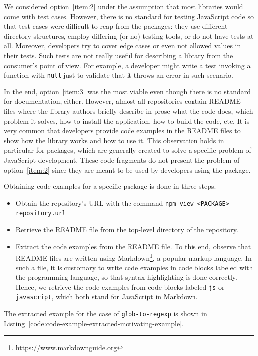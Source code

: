 \documentclass[english,cleveref,autoref,submission]{programming}
\newcommand{\coderef}[1]{Listing~\ref{#1}}
\begin{document}
We considered option~\ref{item:2} under the assumption that most
libraries would come with test cases. However, there is no standard
for testing JavaScript code so that test cases were difficult to reap
from the \NPM{} packages: they use different directory structures,
employ differing (or no) testing tools, or do not have tests
at all. Moreover, developers try to cover edge cases or even not allowed values in their tests. Such tests are not really useful for describing a library from the consumer's point of view. For example, a developer might write a test invoking a function with \texttt{null} just to validate that it throws an error in such scenario.

In the end, option~\ref{item:3} was the most viable even though there
is no standard for documentation, either. However, almost all repositories
contain README files where the library authors briefly describe in prose what
the code does, which problem it solves, how to install the
application, how to build the code, etc. It is very common that
developers provide code examples in the README files to show how the
library works and how to use it. This observation holds in particular
for \NPM{} packages, which are generally created to solve a specific
problem of JavaScript development. These code fragments do not present the problem of option~\ref{item:2} since they are meant to be used by developers using the package.


Obtaining code examples for a specific \NPM{} package is done in three steps.
\begin{itemize}
\item Obtain the  repository's URL with the command
  \texttt{npm view <PACKAGE> repository.url}

\item Retrieve the README file from the top-level directory of the repository.

\item Extract the code examples from the README file. To this end,
  observe that README files are
  written using Markdown\footnote{\url{https://www.markdownguide.org}}, a
  popular markup language. In such a file, it is customary to write
  code examples in code blocks labeled with the programming
  language, so that syntax highlighting is done correctly. Hence, we
  retrieve the code examples from code blocks labeled \texttt{js} or
  \texttt{javascript}, which both stand for JavaScript in
  Markdown.
\end{itemize}

The extracted example for the case of \texttt{glob-to-regexp} is shown in \coderef{code:code-example-extracted-motivating-example}.
\end{document}
